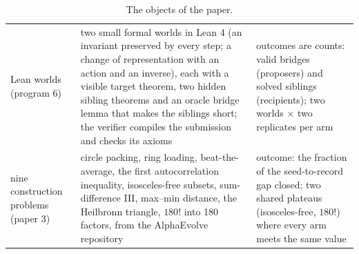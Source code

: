 \documentclass[11pt]{article}
\begin{document}
\begin{table}[!htbp]
\begin{tabular}{R{2.3cm} R{6.0cm} R{6.6cm}}
Lean worlds (program 6) & two small formal worlds in Lean 4 (an invariant preserved by every step; a change of representation with an action and an inverse), each with a visible target theorem, two hidden sibling theorems and an oracle bridge lemma that makes the siblings short; the verifier compiles the submission and checks its axioms & outcomes are counts: valid bridges (proposers) and solved siblings (recipients); two worlds $\times$ two replicates per arm \\
nine construction problems (paper 3) & circle packing, ring loading, beat-the-average, the first autocorrelation inequality, isosceles-free subsets, sum-difference III, max--min distance, the Heilbronn triangle, $180!$ into 180 factors, from the AlphaEvolve repository \citep{georgiev2025exploration} & outcome: the fraction of the seed-to-record gap closed; two shared plateaus (isosceles-free, $180!$) where every arm meets the same value \\
\bottomrule
\end{tabular}
\caption{The objects of the paper.}
\label{tab:problems}
\end{table}
\end{document}
